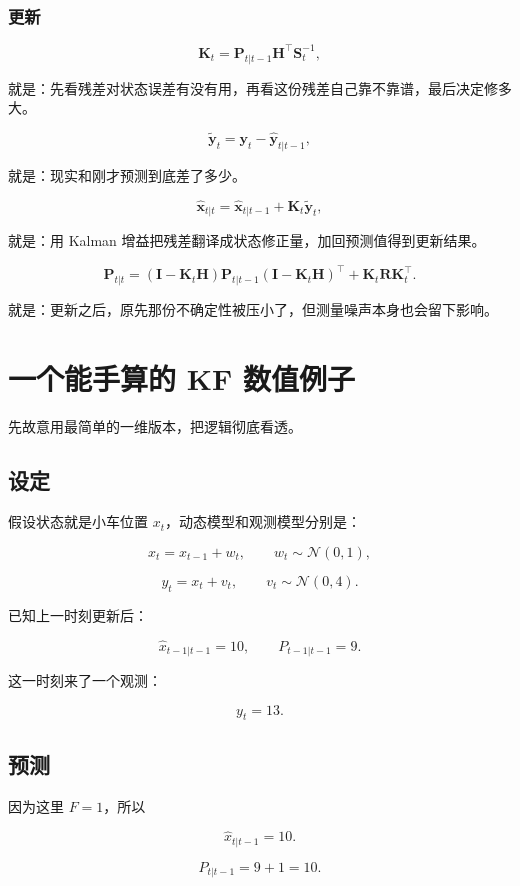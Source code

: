 \documentclass[12pt,a4paper]{ctexart}
\begin{document}
\subsubsection{更新}

\[
\bm{K}_t = \bm{P}_{t|t-1}\bm{H}^\top\bm{S}_t^{-1},
\]

就是：先看残差对状态误差有没有用，再看这份残差自己靠不靠谱，最后决定修多大。

\[
\tilde{\bm{y}}_t = \bm{y}_t - \hat{\bm{y}}_{t|t-1},
\]

就是：现实和刚才预测到底差了多少。

\[
\hat{\bm{x}}_{t|t} = \hat{\bm{x}}_{t|t-1} + \bm{K}_t\tilde{\bm{y}}_t,
\]

就是：用 Kalman 增益把残差翻译成状态修正量，加回预测值得到更新结果。

\[
\bm{P}_{t|t}
= (\bm{I} - \bm{K}_t\bm{H})\bm{P}_{t|t-1}(\bm{I} - \bm{K}_t\bm{H})^\top
+ \bm{K}_t\bm{R}\bm{K}_t^\top.
\]

就是：更新之后，原先那份不确定性被压小了，但测量噪声本身也会留下影响。

\section{一个能手算的 KF 数值例子}

先故意用最简单的一维版本，把逻辑彻底看透。

\subsection{设定}

假设状态就是小车位置 \(x_t\)，动态模型和观测模型分别是：

\[
x_t = x_{t-1} + w_t,\qquad w_t \sim \mathcal{N}(0,1),
\]

\[
y_t = x_t + v_t,\qquad v_t \sim \mathcal{N}(0,4).
\]

已知上一时刻更新后：

\[
\hat{x}_{t-1|t-1} = 10,\qquad P_{t-1|t-1} = 9.
\]

这一时刻来了一个观测：

\[
y_t = 13.
\]

\subsection{预测}

因为这里 \(F=1\)，所以

\[
\hat{x}_{t|t-1} = 10.
\]

\[
P_{t|t-1} = 9 + 1 = 10.
\]
\end{document}

